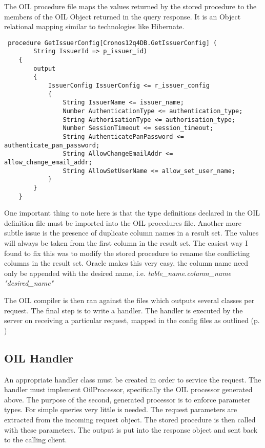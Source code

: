 \documentclass[a4paper, 11pt, titlepage]{article}
\begin{document}
The OIL procedure file maps the values returned by the stored procedure to the members of the OIL Object returned in the query response. It is an Object relational mapping similar to technologies like Hibernate. 
\begin{verbatim} 
 procedure GetIssuerConfig[Cronos12q4DB.GetIssuerConfig] ( 
        String IssuerId => p_issuer_id) 
    { 
        output 
        { 
            IssuerConfig IssuerConfig <= r_issuer_config 
            { 
                String IssuerName <= issuer_name; 
                Number AuthenticationType <= authentication_type; 
                String AuthorisationType <= authorisation_type; 
                Number SessionTimeout <= session_timeout; 
                String AuthenticatePanPassword <= authenticate_pan_password; 
                String AllowChangeEmailAddr <= allow_change_email_addr; 
                String AllowSetUserName <= allow_set_user_name; 
            } 
        } 
    }  
\end{verbatim} 
One important thing to note here is that the type definitions declared in the OIL definition file must be imported into the OIL procedures file. Another more subtle issue is the presence of duplicate column names in a result set. The values will always be taken from the first column in the result set. The easiest way I found to fix this was to modify the stored procedure to rename the conflicting columns in the result set. Oracle makes this very easy, the column name need only be appended with the desired name, i.e. \textit{ table\_name.column\_name "desired\_name" } 
 
The OIL compiler is then ran against the files which outputs several classes per request.  The final step is to write a handler. The handler is executed by the server on receiving a particular request, mapped in the config files as outlined (p. \pageref{handlerset})
 
\subsection{OIL Handler} 
An appropriate handler class must be created in order to service the request. The handler must implement OilProcessor, specifically the OIL processor generated above. The purpose of the second, generated processor is to enforce parameter types. For simple queries very little is needed. The request parameters are extracted from the incoming request object. The stored procedure is then called with these parameters. The output is put into the response object and sent back to the calling client. 
 
\end{document}
